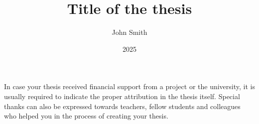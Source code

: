 \documentclass[
]{elteikthesis}[2024/04/26]
\title{Title of the thesis} %
\date{2025} %
\author{John Smith}
\affiliation{Assistant Lecturer} %
\begin{document}


\maketitle
%

\tableofcontents
\cleardoublepage



\cleardoublepage


\cleardoublepage


\cleardoublepage


\cleardoublepage


\cleardoublepage

\chapter*{\acklabel}
In case your thesis received financial support from a project or the university, it is usually required to indicate the proper attribution in the thesis itself. Special thanks can also be expressed towards teachers, fellow students and colleagues who helped you in the process of creating your thesis.

\appendix

\cleardoublepage

{}
\printbibliography[title=\biblabel]
\cleardoublepage

{}
\listoffigures
\cleardoublepage

{}
\listoftables
\cleardoublepage

{}
\listofalgorithms
\cleardoublepage

{}
\lstlistoflistings
\cleardoublepage

\end{document}
